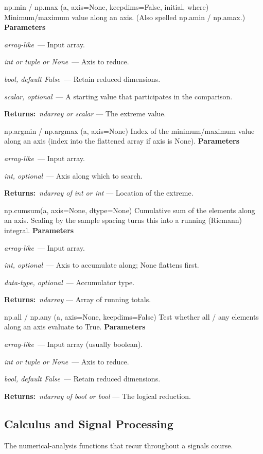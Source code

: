 \documentclass[10pt]{article}
\newenvironment{params}
  {\smallskip\textbf{\small\color{accent}Parameters}\par\nopagebreak
   \begin{description}[leftmargin=1.3em,itemsep=1.5pt,parsep=0pt,topsep=1pt,
      labelindent=0pt,style=sameline,font=\normalfont]}
  {\end{description}}
\newcommand{\pitem}[3]{\item[{\ttfamily\color{accent}#1}]{\itshape #2}\ --- #3}
\newcommand{\preturn}[2]{\smallskip\textbf{\small\color{accent}Returns:}\ {\itshape #1} --- #2\par}
\begin{document}
\begin{func}{np.min / np.max  (a, axis=None, keepdims=False, initial, where)}
Minimum/maximum value along an axis. (Also spelled np.amin / np.amax.)
\begin{params}
\pitem{a}{array-like}{Input array.}
\pitem{axis}{int or tuple or None}{Axis to reduce.}
\pitem{keepdims}{bool, default False}{Retain reduced dimensions.}
\pitem{initial}{scalar, optional}{A starting value that participates in the comparison.}
\end{params}
\preturn{ndarray or scalar}{The extreme value.}
\end{func}
\medskip

\begin{func}{np.argmin / np.argmax  (a, axis=None)}
Index of the minimum/maximum value along an axis (index into the flattened array if axis is None).
\begin{params}
\pitem{a}{array-like}{Input array.}
\pitem{axis}{int, optional}{Axis along which to search.}
\end{params}
\preturn{ndarray of int or int}{Location of the extreme.}
\end{func}
\medskip

\begin{func}{np.cumsum(a, axis=None, dtype=None)}
Cumulative sum of the elements along an axis. Scaling by the sample spacing turns this into a running (Riemann) integral.
\begin{params}
\pitem{a}{array-like}{Input array.}
\pitem{axis}{int, optional}{Axis to accumulate along; None flattens first.}
\pitem{dtype}{data-type, optional}{Accumulator type.}
\end{params}
\preturn{ndarray}{Array of running totals.}
\end{func}
\medskip

\begin{func}{np.all / np.any  (a, axis=None, keepdims=False)}
Test whether all / any elements along an axis evaluate to True.
\begin{params}
\pitem{a}{array-like}{Input array (usually boolean).}
\pitem{axis}{int or tuple or None}{Axis to reduce.}
\pitem{keepdims}{bool, default False}{Retain reduced dimensions.}
\end{params}
\preturn{ndarray of bool or bool}{The logical reduction.}
\end{func}
\medskip

\subsection{Calculus and Signal Processing}
The numerical-analysis functions that recur throughout a signals course.
\end{document}

